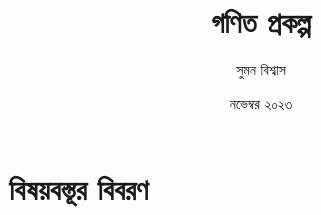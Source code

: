 \documentclass[12pt, a4paper]{book}
\title{ গণিত প্রকল্প }
\author{ সুমন বিশ্বাস }
\date{ নভেম্বর ২০২৩ }
\begin{document}





% 

% 

\section{ বিষয়বস্তূর বিবরণ }


% 

% 

%     
%      

\end{document}
